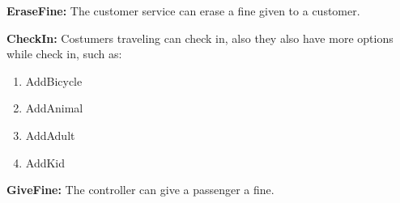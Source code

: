 \textbf{EraseFine:}
The customer service can erase a fine given to a customer.

\textbf{CheckIn:}
Costumers traveling can check in, also they also have more options while check in, such as:
\begin{enumerate}
	\item AddBicycle
	\item AddAnimal
	\item AddAdult
	\item AddKid
\end{enumerate}

\textbf{GiveFine:}
The controller can give a passenger a fine.


\begin{figure}[ht!]
\centering
{}
\label{aser}
\end{figure}

